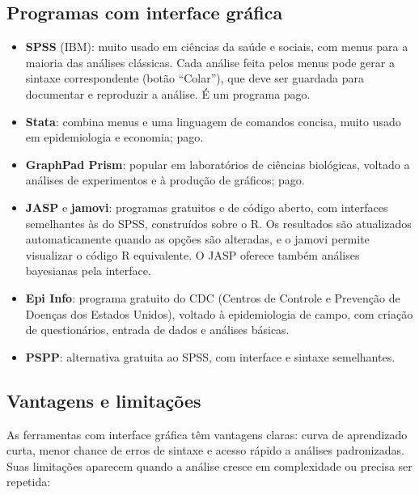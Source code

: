 \documentclass[
]{book}
\providecommand{\tightlist}{%
  \setlength{\itemsep}{0pt}\setlength{\parskip}{0pt}}
\begin{document}
\subsection{Programas com interface gráfica}\label{programas-com-interface-gruxe1fica}

\begin{itemize}
\tightlist
\item
  \textbf{SPSS} (IBM): muito usado em ciências da saúde e sociais, com menus para a maioria das análises clássicas. Cada análise feita pelos menus pode gerar a sintaxe correspondente (botão ``Colar''), que deve ser guardada para documentar e reproduzir a análise. É um programa pago.
\item
  \textbf{Stata}: combina menus e uma linguagem de comandos concisa, muito usado em epidemiologia e economia; pago.
\item
  \textbf{GraphPad Prism}: popular em laboratórios de ciências biológicas, voltado a análises de experimentos e à produção de gráficos; pago.
\item
  \textbf{JASP} e \textbf{jamovi}: programas gratuitos e de código aberto, com interfaces semelhantes às do SPSS, construídos sobre o R. Os resultados são atualizados automaticamente quando as opções são alteradas, e o jamovi permite visualizar o código R equivalente. O JASP oferece também análises bayesianas pela interface.
\item
  \textbf{Epi Info}: programa gratuito do CDC (Centros de Controle e Prevenção de Doenças dos Estados Unidos), voltado à epidemiologia de campo, com criação de questionários, entrada de dados e análises básicas.
\item
  \textbf{PSPP}: alternativa gratuita ao SPSS, com interface e sintaxe semelhantes.
\end{itemize}

\subsection{Vantagens e limitações}\label{vantagens-e-limitauxe7uxf5es}

As ferramentas com interface gráfica têm vantagens claras: curva de aprendizado curta, menor chance de erros de sintaxe e acesso rápido a análises padronizadas. Suas limitações aparecem quando a análise cresce em complexidade ou precisa ser repetida:
\end{document}
